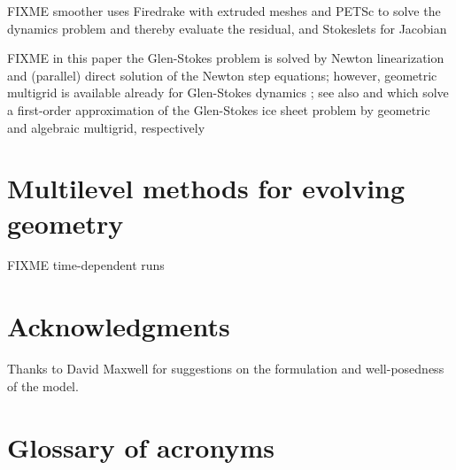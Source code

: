 \documentclass[letterpaper,final,12pt,reqno]{amsart}
\theoremstyle{claim}
\numberwithin{equation}{section}
\numberwithin{figure}{section}
\numberwithin{table}{section}
\numberwithin{theorem}{section}
\begin{document}
FIXME smoother uses Firedrake \cite{Alnaesetal2014,Rathgeberetal2016} with extruded meshes \cite{Gibsonetal2019,McRaeetal2016} and PETSc \cite{Balayetal2020,Bueler2021} to solve the dynamics problem and thereby evaluate the residual, and Stokeslets for Jacobian

FIXME in this paper the Glen-Stokes problem is solved by Newton linearization and (parallel) direct solution of the Newton step equations; however, geometric multigrid is available already for Glen-Stokes dynamics \cite{IsaacStadlerGhattas2015}; see also \cite{BrownSmithAhmadia2013} and \cite{Tuminaroetal2016} which solve a first-order approximation of the Glen-Stokes ice sheet problem by geometric and algebraic multigrid, respectively


\section{Multilevel methods for evolving geometry} \label{sec:stokesevolution}

FIXME time-dependent runs


\section*{Acknowledgments}  Thanks to David Maxwell for suggestions on the formulation and well-posedness of the model.

\small

\bigskip



\appendix

\section{Glossary of acronyms} \label{app:glossary}
\end{document}
